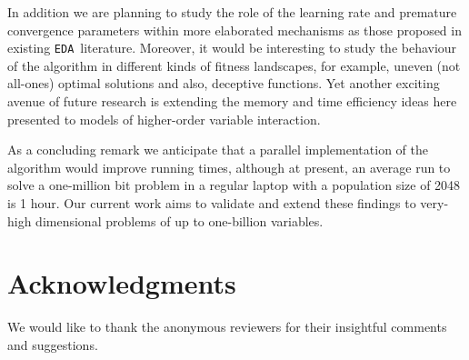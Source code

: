 \documentclass{sig-alternate}
\newcommand{\EDA}{\texttt{EDA}}
\begin{document}
In addition we are planning to study the role of the learning rate and premature convergence parameters within more elaborated mechanisms as those proposed in existing \EDA~literature. Moreover, it would be interesting to study the behaviour of the algorithm in different kinds of fitness landscapes, for example, uneven (not all-ones) optimal solutions and also, deceptive functions. Yet another  exciting avenue of future research is extending the memory and time efficiency ideas here presented to models of higher-order variable interaction. 

As a concluding remark we anticipate that a parallel implementation of the algorithm would improve running times, although at present, an average run to solve a one-million bit problem in a regular laptop with a population size of 2048 is 1 hour. Our current work aims to validate and extend these findings to very-high dimensional problems of up to one-billion variables.

\section{Acknowledgments}
We would like to thank the anonymous reviewers for their insightful comments and suggestions.


  
\vfill
\end{document}
